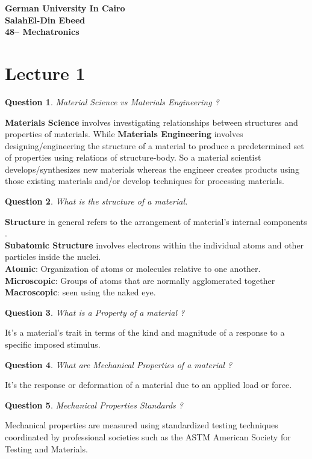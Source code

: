 \documentclass[13]{article}
\newtheorem{exer}{Question}
\begin{document}
\begin{center}

\LARGE \textbf{German University In Cairo
	\\ SalahEl-Din Ebeed 
	\\ 48-- Mechatronics 
}
\end{center}
\section{Lecture 1}
\begin{exer}
Material Science vs Materials Engineering ?
\end{exer}
\textbf{Materials Science} involves investigating relationships between structures and properties of materials. While \textbf{Materials Engineering} involves designing/engineering the structure of a material to produce a predetermined set of properties using relations of structure-body. So a material scientist   develops/synthesizes new materials whereas the engineer creates products using those existing materials and/or develop techniques for processing materials.
\begin{exer}
What is the structure of a material.
\end{exer}
\textbf{Structure} in general refers to the arrangement of material's internal components . \\
\textbf{Subatomic Structure} involves electrons within the individual atoms and other particles inside the nuclei.\\
\textbf{Atomic}: Organization of atoms or molecules relative  to one another. \\
\textbf{Microscopic}: Groups of atoms that are normally agglomerated together\\
\textbf{Macroscopic}: seen using the naked eye.
\begin{exer}
What is a Property of a material ?
\end{exer}
It's a material's trait in terms of the kind and magnitude of a response to a specific imposed stimulus. 
\begin{exer}
What are Mechanical Properties of a material ?
\end{exer}
It's the response or deformation of a material due to an applied load or force.
\begin{exer}
Mechanical Properties Standards ?
\end{exer}
Mechanical properties are measured using standardized testing
techniques coordinated by professional societies such as the ASTM American Society for Testing and Materials. 
\end{document}
